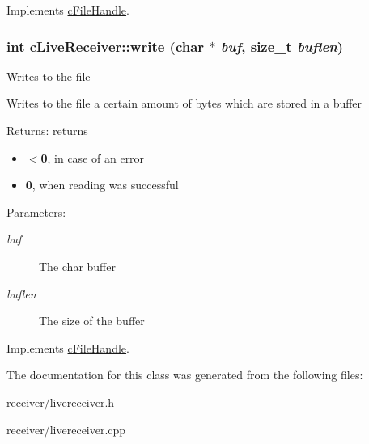 Implements \hyperlink{classcFileHandle_d2dde523301abe5e79e6109a93ba705b}{cFileHandle}.\hypertarget{classcLiveReceiver_eb56988441b589b6e34ea01825dfb183}{
\subsubsection[{write}]{\setlength{\rightskip}{0pt plus 5cm}int cLiveReceiver::write (char $\ast$ {\em buf}, \/  size\_\-t {\em buflen})}}
\label{classcLiveReceiver_eb56988441b589b6e34ea01825dfb183}


Writes to the file

Writes to the file a certain amount of bytes which are stored in a buffer

\begin{Desc}
\item[Returns:]returns\begin{itemize}
\item {\bf $<$0}, in case of an error\item {\bf 0}, when reading was successful\end{itemize}
\end{Desc}
\begin{Desc}
\item[Parameters:]
\begin{description}
\item[{\em buf}]The char buffer \item[{\em buflen}]The size of the buffer \end{description}
\end{Desc}
 

Implements \hyperlink{classcFileHandle_e1495303f52f6f2d7ac37a030f78a937}{cFileHandle}.

The documentation for this class was generated from the following files:\begin{CompactItemize}
\item 
receiver/livereceiver.h\item 
receiver/livereceiver.cpp\end{CompactItemize}
